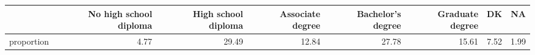 \begin{table}[ht]
\centering
\begin{tabular}{rrrrrrrr}
  \hline
 & No high school diploma & High school diploma & Associate degree & Bachelor's degree & Graduate degree & DK & NA \\ 
  \hline
proportion & 4.77 & 29.49 & 12.84 & 27.78 & 15.61 & 7.52 & 1.99 \\ 
   \hline
\end{tabular}
\end{table}
